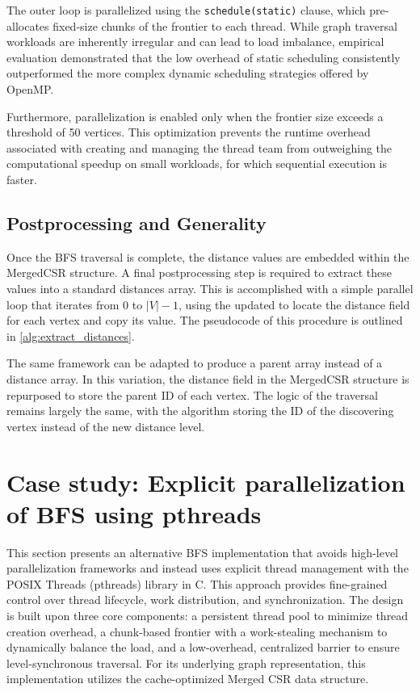 The outer loop is parallelized using the \texttt{schedule(static)} clause, which pre-allocates fixed-size chunks of the frontier to each thread. While graph traversal workloads are inherently irregular and can lead to load imbalance, empirical evaluation demonstrated that the low overhead of static scheduling consistently outperformed the more complex dynamic scheduling strategies offered by OpenMP.

Furthermore, parallelization is enabled only when the frontier size exceeds a threshold of 50 vertices. This optimization prevents the runtime overhead associated with creating and managing the thread team from outweighing the computational speedup on small workloads, for which sequential execution is faster.

\subsection{Postprocessing and Generality}

Once the BFS traversal is complete, the distance values are embedded within the MergedCSR structure. A final postprocessing step is required to extract these values into a standard distances array. This is accomplished with a simple parallel loop that iterates from $0$ to $|V|-1$, using the updated \rowptr{} to locate the distance field for each vertex and copy its value. The pseudocode of this procedure is outlined in \cref{alg:extract_distances}.

The same framework can be adapted to produce a parent array instead of a distance array. In this variation, the distance field in the MergedCSR structure is repurposed to store the parent ID of each vertex. The logic of the traversal remains largely the same, with the algorithm storing the ID of the discovering vertex instead of the new distance level.

\newpage

\section{Case study: Explicit parallelization of BFS using pthreads}
\label{sec:pthreads}

This section presents an alternative BFS implementation that avoids high-level parallelization frameworks and instead uses explicit thread management with the POSIX Threads (pthreads) library in C. This approach provides fine-grained control over thread lifecycle, work distribution, and synchronization. The design is built upon three core components: a persistent thread pool to minimize thread creation overhead, a chunk-based frontier with a work-stealing mechanism to dynamically balance the load, and a low-overhead, centralized barrier to ensure level-synchronous traversal. For its underlying graph representation, this implementation utilizes the cache-optimized Merged CSR data structure.


